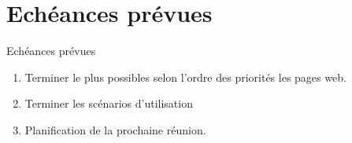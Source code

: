 \documentclass[numbering=fraction]{beamer}
\begin{document}
\section{Echéances prévues}
\begin{frame}{Echéances prévues}
    \begin{enumerate}
        \item Terminer le plus possibles selon l'ordre des priorités les pages web.
        \item Terminer les scénarios d'utilisation
        \item Planification de la prochaine réunion.
    \end{enumerate}
\end{frame}
\end{document}
